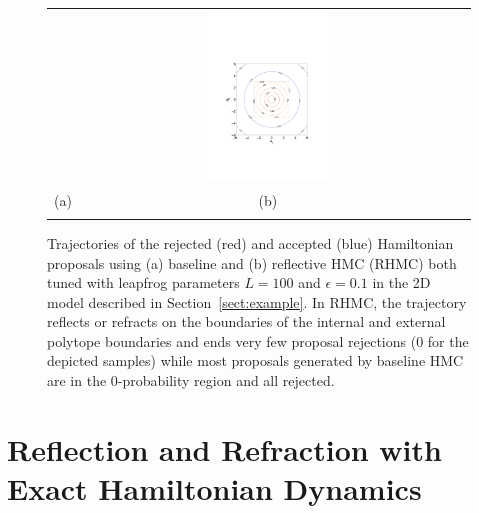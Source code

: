 \documentclass{article} %
\begin{document}
\begin{figure}[t!]
\begin{center}
\begin{tabular}{ccc}
&\includegraphics[trim={3.2cm 6cm 3.2cm 9cm},clip,width=0.33\textwidth]{../plots3/dist_contour.pdf} 
\vspace{-1.5mm}
\\
   \hspace{-5mm} \footnotesize(a) 
& \hspace{-4mm} \footnotesize(b) 
\\
\multicolumn{2}{c}{}
\end{tabular}
\end{center}
\vspace{-8mm}
\caption{\footnotesize
Trajectories of the rejected (red) and accepted (blue) Hamiltonian proposals using (a) baseline and (b) reflective HMC (RHMC) both tuned with leapfrog parameters $L=100$ and $\epsilon=0.1$ in the 2D model described in Section~\ref{sect:example}. 
In RHMC, the trajectory reflects or refracts on the boundaries of the internal and external polytope boundaries and ends very few proposal rejections (0 for the depicted samples) while most proposals generated by baseline HMC are in the 0-probability region and all rejected.   
} 
\label{fig:mom}
\vspace{-10pt}
\end{figure}
\section{Reflection and Refraction with Exact Hamiltonian Dynamics}
\end{document}
